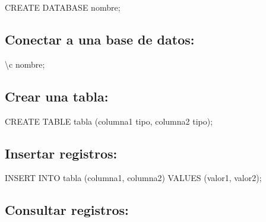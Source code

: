 \documentclass[
  a4paper,
  DIV=11,
  numbers=noendperiod,
  onepage,
  openany]{scrreprt}
\newenvironment{Shaded}{\begin{snugshade}}{\end{snugshade}}
\newcommand{\KeywordTok}[1]{\textcolor[rgb]{0.00,0.23,0.31}{#1}}
\newcommand{\NormalTok}[1]{\textcolor[rgb]{0.00,0.23,0.31}{#1}}
\begin{document}
\begin{Shaded}
\begin{Highlighting}[]
\KeywordTok{CREATE} \KeywordTok{DATABASE}\NormalTok{ nombre;}
\end{Highlighting}
\end{Shaded}

\hypertarget{conectar-a-una-base-de-datos-1}{%
\subsection{Conectar a una base de
datos:}\label{conectar-a-una-base-de-datos-1}}

\begin{Shaded}
\begin{Highlighting}[]
\NormalTok{\textbackslash{}c nombre;}
\end{Highlighting}
\end{Shaded}

\hypertarget{crear-una-tabla-1}{%
\subsection{Crear una tabla:}\label{crear-una-tabla-1}}

\begin{Shaded}
\begin{Highlighting}[]
\KeywordTok{CREATE} \KeywordTok{TABLE}\NormalTok{ tabla (columna1 tipo, columna2 tipo);}
\end{Highlighting}
\end{Shaded}

\hypertarget{insertar-registros-1}{%
\subsection{Insertar registros:}\label{insertar-registros-1}}

\begin{Shaded}
\begin{Highlighting}[]
\KeywordTok{INSERT} \KeywordTok{INTO}\NormalTok{ tabla (columna1, columna2) }\KeywordTok{VALUES}\NormalTok{ (valor1, valor2);}
\end{Highlighting}
\end{Shaded}

\hypertarget{consultar-registros-1}{%
\subsection{Consultar registros:}\label{consultar-registros-1}}
\end{document}
